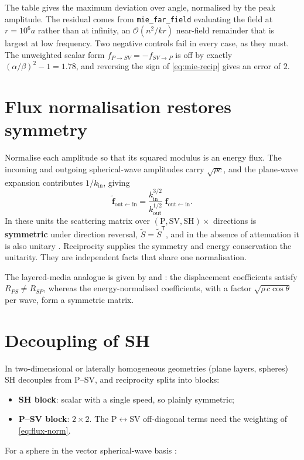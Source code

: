 \documentclass[11pt,a4paper]{article}
\newcommand{\bfv}{\mathbf{f}}
\newcommand{\kin}{k_{\mathrm{in}}}
\newcommand{\kout}{k_{\mathrm{out}}}
\newcommand{\fout}{\bfv_{\mathrm{out}\leftarrow\mathrm{in}}}
\begin{document}
\noindent The table gives the maximum deviation over angle, normalised by
the peak amplitude. The residual comes from \texttt{mie\_far\_field}
evaluating the field at $r = 10^{6}a$ rather than at infinity, an
$\mathcal{O}(n^2/kr)$ near-field remainder that is largest at low
frequency. Two negative controls fail in every case, as they must. The
unweighted scalar form $f_{P\to SV} = -f_{SV\to P}$ is off by exactly
$(\alpha/\beta)^2 - 1 = 1.78$, and reversing the sign of
\eqref{eq:mie-recip} gives an error of $2$.

\section{Flux normalisation restores symmetry}
\label{sec:flux}

Normalise each amplitude so that its squared modulus is an energy flux.
The incoming and outgoing spherical-wave amplitudes carry
$\sqrt{\rho c}$, and the plane-wave expansion contributes $1/\kin$,
giving
\begin{equation}
  \tilde{\bfv}_{\mathrm{out}\leftarrow\mathrm{in}}
  = \frac{\kin^{3/2}}{\kout^{1/2}}\; \fout .
  \label{eq:flux-norm}
\end{equation}
In these units the scattering matrix over
$(\mathrm{P}, \mathrm{SV}, \mathrm{SH}) \times$ directions is
\textbf{symmetric} under direction reversal,
$\tilde{S} = \tilde{S}^{\mathsf T}$, and in the absence of attenuation it
is also unitary \citep{VaratharajuluPao1976,Varatharajulu1977}.
Reciprocity supplies the symmetry and energy
conservation the unitarity. They are independent facts that share one
normalisation.

The layered-media analogue is given by \citet[Ch.~5]{AkiRichards2002}
and \citet{Kennett1983}: the displacement
coefficients satisfy $R_{PS} \neq R_{SP}$, whereas the
energy-normalised coefficients, with a factor
$\sqrt{\rho\, c \cos\theta}$ per wave, form a symmetric matrix.

\section{Decoupling of SH}
\label{sec:sh}

In two-dimensional or laterally homogeneous geometries (plane layers,
spheres) SH decouples from P--SV, and reciprocity splits into blocks:
\begin{itemize}
\item \textbf{SH block}: scalar with a single speed, so plainly symmetric;
\item \textbf{P--SV block}: $2\times 2$. The P$\leftrightarrow$SV
  off-diagonal terms need the weighting of \eqref{eq:flux-norm}.
\end{itemize}
For a sphere in the vector spherical-wave basis
\citep{MorseFeshbach1953,BenMenahemSingh1981}:
\end{document}
